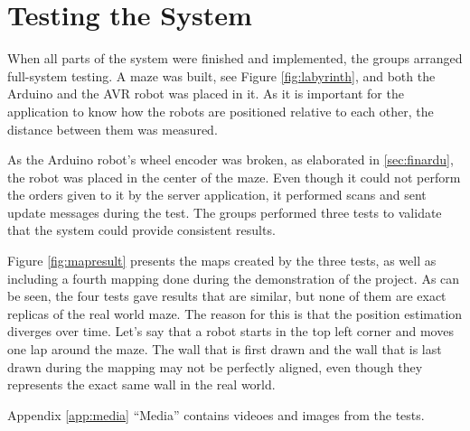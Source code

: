 \chapter{Testing the System}
When all parts of the system were finished and implemented, the groups arranged full-system testing. A maze was built, see Figure \ref{fig:labyrinth}, and both the Arduino and the AVR robot was placed in it. As it is important for the application to know how the robots are positioned relative to each other, the distance between them was measured.


As the Arduino robot's wheel encoder was broken, as elaborated in \ref{sec:finardu}, the robot was placed in the center of the maze. Even though it could not perform the orders given to it by the server application, it performed scans and sent update messages during the test. The groups performed three tests to validate that the system could provide consistent results.

Figure \ref{fig:mapresult} presents the maps created by the three tests, as well as including a fourth mapping done during the demonstration of the project. As can be seen, the four tests gave results that are similar, but none of them are exact replicas of the real world maze. The reason for this is that the position estimation diverges over time. Let's say that a robot starts in the top left corner and moves one lap around the maze. The wall that is first drawn and the wall that is last drawn during the mapping may not be perfectly aligned, even though they represents the exact same wall in the real world.

Appendix \ref{app:media} ``Media'' contains videoes and images from the tests.


